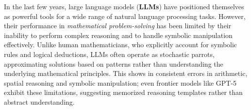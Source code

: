 \documentclass{article}
\begin{document}



In the last few years, large language models (\textbf{LLMs}) have positioned themselves as powerful tools for a wide range of natural language processing tasks. However, their performance in \textit{mathematical problem-solving} has been limited by their inability to perform complex reasoning and to handle symbolic manipulation effectively. Unlike human mathematicians, who explicitly account for symbolic rules and logical deductions, LLMs often operate as stochastic parrots, approximating solutions based on patterns rather than understanding the underlying mathematical principles. This shows in consistent errors in arithmetic, spatial reasoning and symbolic manipulation; even frontier models like GPT-5 exhibit these limitations, suggesting memorized reasoning templates rather than abstract understanding.
\end{document}

